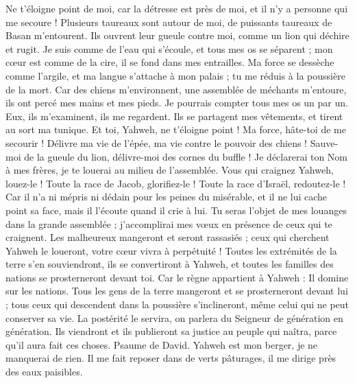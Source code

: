 \begin{multicols}{2}
Ne t'éloigne point de moi, car la détresse est près de moi, et il n'y a personne qui me secoure !
Plusieurs taureaux sont autour de moi, de puissants taureaux de Basan m'entourent.
Ils ouvrent leur gueule contre moi, comme un lion qui déchire et rugit.
Je suis comme de l'eau qui s’écoule, et tous mes os se séparent ; mon cœur est comme de la cire, il se fond dans mes entrailles.
Ma force se dessèche comme l’argile, et ma langue s’attache à mon palais ; tu me réduis à la poussière de la mort.
Car des chiens m'environnent, une assemblée de méchants m'entoure, ils ont percé mes mains et mes pieds.
Je pourrais compter tous mes os un par un. Eux, ils m’examinent, ils me regardent.
Ils se partagent mes vêtements, et tirent au sort ma tunique.
Et toi, Yahweh, ne t'éloigne point ! Ma force, hâte-toi de me secourir !
Délivre ma vie de l'épée, ma vie contre le pouvoir des chiens !
Sauve-moi de la gueule du lion, délivre-moi des cornes du buffle !
Je déclarerai ton Nom à mes frères, je te louerai au milieu de l'assemblée.
Vous qui craignez Yahweh, louez-le ! Toute la race de Jacob, glorifiez-le ! Toute la race d'Israël, redoutez-le !
Car il n'a ni mépris ni dédain pour les peines du misérable, et il ne lui cache point sa face, mais il l’écoute quand il crie à lui.
Tu seras l’objet de mes louanges dans la grande assemblée ; j’accomplirai mes vœux en présence de ceux qui te craignent.
Les malheureux mangeront et seront rassasiés ; ceux qui cherchent Yahweh le loueront, votre cœur vivra à perpétuité !
Toutes les extrémités de la terre s'en souviendront, ils se convertiront à Yahweh, et toutes les familles des nations se prosterneront devant toi.
Car le règne appartient à Yahweh : Il domine sur les nations.
Tous les gens de la terre mangeront et se prosterneront devant lui ; tous ceux qui descendent dans la poussière s'inclineront, même celui qui ne peut conserver sa vie.
La postérité le servira, on parlera du Seigneur de génération en génération.
Ils viendront et ils publieront sa justice au peuple qui naîtra, parce qu'il aura fait ces choses.
\VerseOne{}Psaume de David. Yahweh est mon berger, je ne manquerai de rien.
Il me fait reposer dans de verts pâturages, il me dirige près des eaux paisibles.

\end{multicols}
